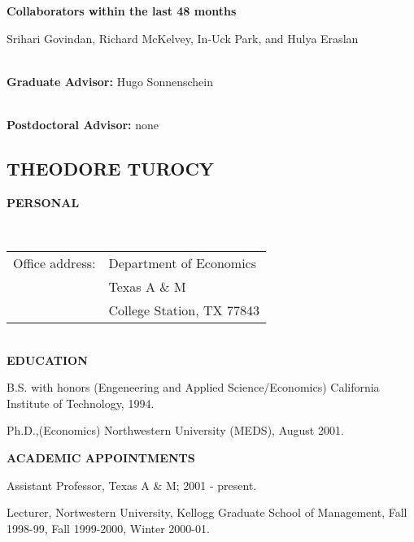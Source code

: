 \documentclass[12pt]{article}
\begin{document}
\noindent
{\bf Collaborators within the last 48 months} 

Srihari Govindan, Richard McKelvey, In-Uck Park, and Hulya Eraslan

\ \\
\noindent
{\bf Graduate Advisor:} Hugo Sonnenschein

\ \\
\noindent
{\bf Postdoctoral Advisor:} none

\newpage
\subsection{THEODORE TUROCY}

\noindent
{\bf PERSONAL} 

\ \\
\begin{tabular}{ll}
Office address:&Department of Economics \\
&Texas A \& M \\
&College Station, TX 77843 \\
\end{tabular}

\ \\
\noindent
{\bf EDUCATION}
\begin{description}
\item
B.S. with honors (Engeneering and Applied Science/Economics)
California Institute of Technology, 1994.
\item
Ph.D.,(Economics) Northwestern University (MEDS), August 2001.
\end{description}

\noindent
{\bf ACADEMIC APPOINTMENTS}
\begin{description}
\item
Assistant Professor, Texas A \& M; 2001 - present. 
\item
Lecturer, Nortwestern University, Kellogg Graduate School of
Management, Fall 1998-99, Fall 1999-2000, Winter 2000-01.
\end{description}
\end{document}
